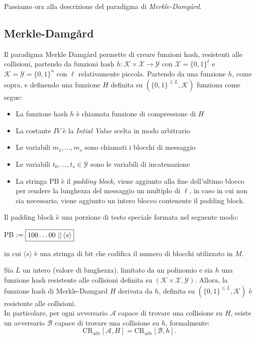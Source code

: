 \vspace{1em} \noindent Passiamo ora alla descrizione del paradigma di \emph{Merkle-Damgård}. 

\subsection{Merkle-Damgård}
Il paradigma Merkle Damgård permette di creare funzioni hash, resistenti alle collisioni, partendo da funzioni hash $h: \mathcal{K} \times \mathcal{X} \to \mathcal{Y}$ con $\mathcal{X} = \{0,1\}^{\ell}$ e $\mathcal{K} = \mathcal{Y} = \{0,1\}^n$ con $\ell$ relativamente piccola. Partendo da una funzione $h$, come sopra, e definendo una funzione $H$ definita su $(\{0,1\}^{\leq L}, \mathcal{K})$ funziona come segue:



\begin{itemize}
    \item La funzione hash $h$ è chiamata funzione di compressione di $H$
    \item La costante $IV$ è la \emph{Intial Value} scelta in modo arbitrario
    \item Le variabili $m_1,\dots,m_s$ sono chiamati i blocchi di messaggio
    \item Le variabili $t_0,\dots,t_s \in \mathcal{Y}$ sono le variabili di incatenazione
    \item La stringa PB è il \emph{padding block}, viene aggiunto alla fine dell'ultimo blocco per rendere la lunghezza del messaggio un multiplo di $\ell$, in caso in cui non sia necessario, viene aggiunto un intero blocco contenente il padding block.
\end{itemize}
Il padding block è una porzione di testo speciale formata nel seguente modo:
\begin{center}
    PB $:= \boxed{ 100\dots 00 \operatorname{\,||\,} \langle s \rangle }$
\end{center}
in cui $\langle s \rangle$ è una stringa di bit che codifica il numero di blocchi utilizzato in $M$.

\begin{theorem}
    \label{teoremaMerkle}
    Sia $L$ un intero (valore di lunghezza), limitato da un polinomio e sia $h$ una funzione hash resistente alle collisioni definita su $(\mathcal{K} \times \mathcal{X}, \mathcal{Y})$. Allora, la funzione hash di Merkle-Damgard $H$ derivata da $h$, definita su $(\{0,1\}^{\leq L}, \mathcal{K})$ è resistente alle collisioni. \\ In particolare, per ogni avversario $\mathcal{A}$ capace di trovare una collisione su $H$, esiste un avversario $\mathcal{B}$ capace di trovare una collisione su $h$, formalmente: 
    \[
        \text{CR}_{\text{adv}}[\mathcal{A}, H]= \text{CR}_{\text{adv}}[\mathcal{B}, h].
    \] 
\end{theorem}


